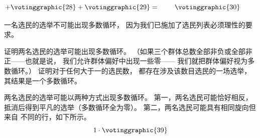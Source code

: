 \begin{exercises}
\begin{answer}
\begin{exparts}
\begin{equation*}
           +  
           \votinggraphic{28}  %
           +  
           \votinggraphic{29}  %
           =\hspace{.30in}
           \votinggraphic{30}  %
           \hspace{.30in}\hbox{}  
         \end{equation*}
      \end{exparts}
    \end{answer}
\item 一名选民的选举不可能出现多数循环，
    因为我们已施加了选民列表必须理性的要求。
    \begin{exparts}
      \partsitem 证明两名选民的选举可能出现多数循环。
        （如果三个群体总数全部非负或全部非正——也就是说，
        我们允许群体偏好中出现一些零——
        我们就把群体偏好视为多数循环。）
      \partsitem 证明对于任何大于一的选民数，
        都存在涉及该数目选民的一场选举，
        其结果是一个多数循环。
    \end{exparts}
    \begin{answer}
      \begin{exparts}
        \partsitem 两名选民的选举可能以两种方式出现多数循环。
          第一，两名选民可能恰好相反，
          抵消后得到平凡的选举（多数循环全为零）。
          第二，两名选民可能具有相同旋向但来自
          不同的行，如下所示。
          \begin{equation*}
            1\cdot \votinggraphic{39}

\end{equation*}
\end{exparts}
\end{answer}
\end{exercises}
